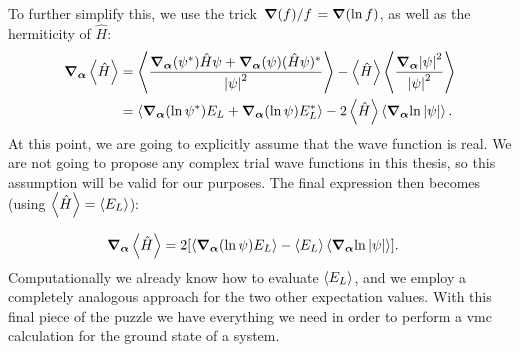 \documentclass[Thesis.tex]{subfiles}
\begin{document}
To further simplify this, we use the trick $\flatfrac{\grad(f)}{f}=\grad(\ln
f)$, as well as the hermiticity of $\hat H$:
\begin{align}
    \grad_{\bm{\alpha}}\expval{\hat H}
    &= \expval{\frac{\grad_{\bm{\alpha}}(\psi^*)\hat H\psi + \grad_{\bm{\alpha}}(\psi)(\hat H\psi)^*}{\abs{\psi}^2}}
    - \expval{\hat H}\expval{\frac{\grad_{\bm{\alpha}}\abs{\psi}^2}{\abs{\psi}^2}}\\
    &= \expval{\grad_{\bm{\alpha}}(\ln \psi^*) E_L + \grad_{\bm{\alpha}}(\ln\psi)E_L^*}
    - 2\expval{\hat H}\expval{\grad_{\bm{\alpha}}{\ln\abs{\psi}}}.
\end{align}
At this point, we are going to explicitly assume that the wave function is
real. We are not going to propose any complex trial wave functions in this
thesis, so this assumption will be valid for our purposes. The final expression then becomes (using $\expval{\hat H}=\expval{E_L}$):

\begin{align}
    \grad_{\bm{\alpha}}\expval{\hat H}
    &= 2\qty[\expval{\grad_{\bm{\alpha}}(\ln \psi) E_L}
    - \expval{E_L}\expval{\grad_{\bm{\alpha}}{\ln\abs{\psi}}}].
    \label{eq:local-energy-gradient-alpha}
\end{align}
Computationally we already know how to evaluate $\expval{E_L}$, and we employ a completely analogous approach for the two other expectation values.
With this final piece of the puzzle we have everything we need in order to perform a \gls{vmc} calculation for the ground state of a system.
\end{document}
